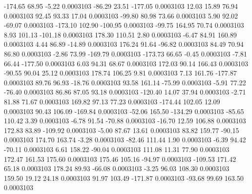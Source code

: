      -174.65       68.95       -5.22     0.0003103
      -86.29       23.51     -177.05     0.0003103
       12.03       15.89       76.94     0.0003103
       92.45       93.33       17.04     0.0003103
      -99.80       80.98       73.66     0.0003103
        5.90       92.02      -69.07     0.0003103
     -173.10      102.90     -100.95     0.0003103
      -99.75      164.95       70.74     0.0003103
        8.93      101.13     -101.18     0.0003103
      178.30      110.51        2.80     0.0003103
       -6.47       84.91      160.89     0.0003103
        4.44       86.89      -14.89     0.0003103
      176.24       91.64      -96.82     0.0003103
       84.49       70.94       86.80     0.0003103
       -2.86       73.99     -169.79     0.0003103
     -173.73       66.65       -0.45     0.0003103
       -7.81       66.44     -177.50     0.0003103
        6.03       94.31       68.67     0.0003103
      172.03       90.14      166.43     0.0003103
      -90.55       90.04       25.12     0.0003103
      178.74      106.25        9.81     0.0003103
        7.13      161.76     -177.87     0.0003103
       89.76       96.93      -18.76     0.0003103
       93.58      161.14      -75.99     0.0003103
       -5.91       77.22      -76.40     0.0003103
       86.86       87.05       93.18     0.0003103
     -120.40       14.07       37.94     0.0003103
       -2.71       81.88       71.67     0.0003103
      169.82       97.13       77.23     0.0003103
     -174.44      102.05       12.09     0.0003103
       90.43      106.09     -169.84     0.0003103
      -52.06      165.50     -134.29     0.0003103
      -85.65      110.42        3.39     0.0003103
       -6.78       91.54      -70.88     0.0003103
      -16.70       12.59      106.88     0.0003103
      172.83       83.89     -109.92     0.0003103
       -5.00       87.67       13.61     0.0003103
       83.82      159.77      -90.15     0.0003103
      174.70      163.74       -3.28     0.0003103
      -82.46      111.44        1.90     0.0003103
       -6.39       94.42      -70.11     0.0003103
        6.61      158.22      -90.04     0.0003103
      111.08       11.31       77.90     0.0003103
      172.47      161.53      175.60     0.0003103
      175.46      105.16      -94.97     0.0003103
     -109.53      171.42       65.18     0.0003103
      178.24       89.93      -66.08     0.0003103
       -3.25       96.03      108.30     0.0003103
      159.50       19.12       24.18     0.0003103
       91.97      103.49     -171.87     0.0003103
      -93.68       99.69      163.50     0.0003103
